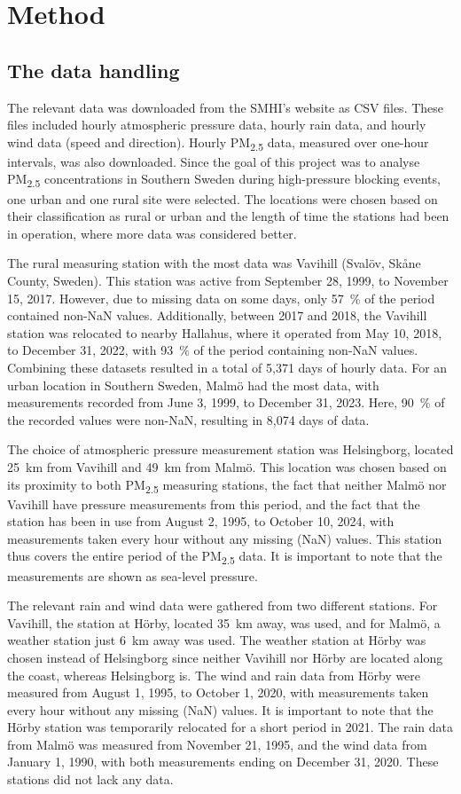 \newpage
\section{Method}
\subsection{The data handling}
The relevant data was downloaded from the SMHI’s website as CSV files. These files included hourly atmospheric pressure data, hourly rain data, and hourly wind data (speed and direction). Hourly PM\textsubscript{2.5} data, measured over one-hour intervals, was also downloaded. Since the goal of this project was to analyse PM\textsubscript{2.5} concentrations in Southern Sweden during high-pressure blocking events, one urban and one rural site were selected. The locations were chosen based on their classification as rural or urban and the length of time the stations had been in operation, where more data was considered better. 

The rural measuring station with the most data was Vavihill (Svalöv, Skåne County, Sweden). This station was active from September 28, 1999, to November 15, 2017. However, due to missing data on some days, only \SI{57}{\%} of the period contained non-NaN values. Additionally, between 2017 and 2018, the Vavihill station was relocated to nearby Hallahus, where it operated from May 10, 2018, to December 31, 2022, with \SI{93}{\%} of the period containing non-NaN values. Combining these datasets resulted in a total of 5,371 days of hourly data. For an urban location in Southern Sweden, Malmö had the most data, with measurements recorded from June 3, 1999, to December 31, 2023. Here, \SI{90}{\%} of the recorded values were non-NaN, resulting in 8,074 days of data.

The choice of atmospheric pressure measurement station was Helsingborg, located \SI{25}{\km} from Vavihill and \SI{49}{\km} from Malmö. This location was chosen based on its proximity to both PM\textsubscript{2.5} measuring stations, the fact that neither Malmö nor Vavihill have pressure measurements from this period, and the fact that the station has been in use from August 2, 1995, to October 10, 2024, with measurements taken every hour without any missing (NaN) values. This station thus covers the entire period of the PM\textsubscript{2.5} data. It is important to note that the measurements are shown as sea-level pressure.

The relevant rain and wind data were gathered from two different stations. For Vavihill, the station at Hörby, located \SI{35}{\km} away, was used, and for Malmö, a weather station just \SI{6}{\km} away was used. The weather station at Hörby was chosen instead of Helsingborg since neither Vavihill nor Hörby are located along the coast, whereas Helsingborg is. The wind and rain data from Hörby were measured from August 1, 1995, to October 1, 2020, with measurements taken every hour without any missing (NaN) values. It is important to note that the Hörby station was temporarily relocated for a short period in 2021. The rain data from Malmö was measured from November 21, 1995, and the wind data from January 1, 1990, with both measurements ending on December 31, 2020. These stations did not lack any data.

